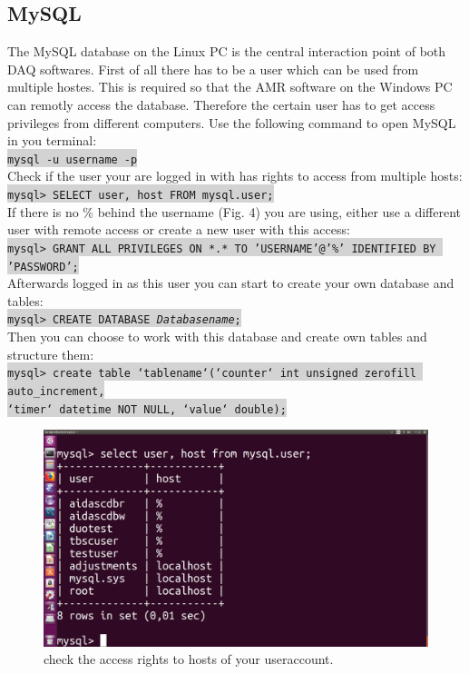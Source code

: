 \documentclass[a4paper,12pt]{scrartcl}
\begin{document}
\subsection{MySQL}
The MySQL database on the Linux PC is the central interaction point of both DAQ softwares. First of all there has to be a user which can be used from multiple hostes. This is required so that the AMR software on the Windows PC can remotly access the database. Therefore the certain user has to get access privileges from different computers. Use the following command to open MySQL in you terminal: \\
\colorbox{lightgray}{\texttt{mysql -u username -p}} \\
Check if the user your are logged in with has rights to access from multiple hosts: \\
\colorbox{lightgray}{\texttt{mysql> SELECT user, host FROM mysql.user;}}\\
If there is no \% behind the username (Fig. 4) you are using, either use a different user with remote access or create a new user with this access: \\
\colorbox{lightgray}{\texttt{mysql> GRANT ALL PRIVILEGES ON *.* TO 'USERNAME'@'\%' IDENTIFIED BY 'PASSWORD';}}\\
Afterwards logged in as this user you can start to create your own database and tables: \\
\colorbox{lightgray}{\texttt{mysql> CREATE DATABASE \textit{Databasename};}}\\
Then you can choose to work with this database and create own tables and structure them: \\
\colorbox{lightgray}{\texttt{mysql> create table `tablename`(`counter` int unsigned zerofill auto\_increment,}}\\
\colorbox{lightgray}{\texttt{`timer` datetime NOT NULL, `value` double);}}\\

\begin{figure} [H]
\centering
\includegraphics[trim={2cm 7cm 0cm 3cm},clip,width=\textwidth]{mysqluser.png}
\caption{check the access rights to hosts of your useraccount.}
\end{figure}
\end{document}

